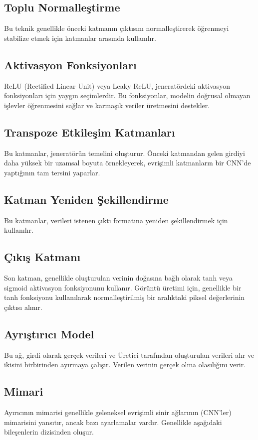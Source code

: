 \documentclass[10pt]{article}
\begin{document}
	\subsection{Toplu Normalleştirme}
	Bu teknik genellikle  önceki katmanın çıktısını normalleştirerek öğrenmeyi stabilize etmek için katmanlar arasında kullanılır.
	\subsection{Aktivasyon Fonksiyonları}
	ReLU (Rectified Linear Unit) veya Leaky ReLU, jeneratördeki aktivasyon fonksiyonları için yaygın seçimlerdir. Bu fonksiyonlar, modelin doğrusal olmayan işlevler öğrenmesini sağlar ve karmaşık veriler üretmesini destekler.
	
	\subsection{Transpoze Etkileşim Katmanları}
	Bu katmanlar, jeneratörün temelini oluşturur. Önceki katmandan gelen girdiyi daha yüksek bir uzamsal boyuta örnekleyerek, evrişimli katmanların bir CNN'de yaptığının tam tersini yaparlar.
	
	\subsection{Katman Yeniden Şekillendirme}
	Bu katmanlar, verileri istenen çıktı formatına yeniden şekillendirmek için kullanılır.
	\subsection{Çıkış Katmanı}
	Son katman, genellikle oluşturulan verinin doğasına bağlı olarak tanh veya sigmoid aktivasyon fonksiyonunu kullanır. Görüntü üretimi için, genellikle bir tanh fonksiyonu kullanılarak normalleştirilmiş bir aralıktaki piksel değerlerinin çıktısı alınır.
	
	\subsection{Ayrıştırıcı Model }
	Bu ağ, girdi olarak gerçek verileri ve Üretici tarafından oluşturulan verileri alır ve ikisini birbirinden ayırmaya çalışır. Verilen verinin gerçek olma olasılığını verir. 
	
	\subsection{Mimari}
	Ayırıcının mimarisi genellikle geleneksel evrişimli sinir ağlarının (CNN'ler) mimarisini yansıtır, ancak bazı ayarlamalar vardır. Genellikle aşağıdaki bileşenlerin dizisinden oluşur.
\end{document}
